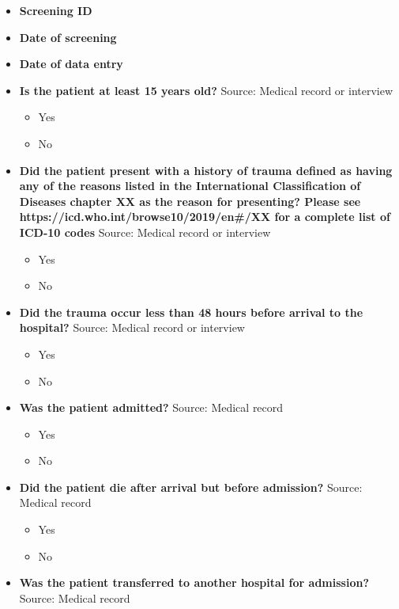\documentclass[
]{scrartcl}
\providecommand{\tightlist}{%
  \setlength{\itemsep}{0pt}\setlength{\parskip}{0pt}}\usepackage{longtable,booktabs,array}
\begin{document}
\begin{itemize}
\item
  \textbf{Screening ID}
\item
  \textbf{Date of screening}
\item
  \textbf{Date of data entry}
\item
  \textbf{Is the patient at least 15 years old?} Source: Medical record
  or interview

  \begin{itemize}
  \tightlist
  \item
    Yes
  \item
    No
  \end{itemize}
\item
  \textbf{Did the patient present with a history of trauma defined as
  having any of the reasons listed in the International Classification
  of Diseases chapter XX as the reason for presenting? Please see
  https://icd.who.int/browse10/2019/en\#/XX for a complete list of
  ICD-10 codes} Source: Medical record or interview

  \begin{itemize}
  \tightlist
  \item
    Yes
  \item
    No
  \end{itemize}
\item
  \textbf{Did the trauma occur less than 48 hours before arrival to the
  hospital?} Source: Medical record or interview

  \begin{itemize}
  \tightlist
  \item
    Yes
  \item
    No
  \end{itemize}
\item
  \textbf{Was the patient admitted?} Source: Medical record

  \begin{itemize}
  \tightlist
  \item
    Yes
  \item
    No
  \end{itemize}
\item
  \textbf{Did the patient die after arrival but before admission?}
  Source: Medical record

  \begin{itemize}
  \tightlist
  \item
    Yes
  \item
    No
  \end{itemize}
\item
  \textbf{Was the patient transferred to another hospital for
  admission?} Source: Medical record


\end{itemize}
\end{document}
